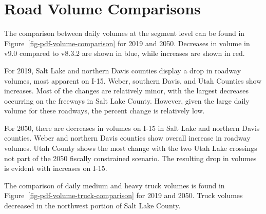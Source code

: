 \documentclass[
  letterpaper,
  DIV=11,
  numbers=noendperiod,
  titlepage=false]{scrreprt}
\begin{document}
\hypertarget{road-volume-comparisons}{%
\section{Road Volume Comparisons}\label{road-volume-comparisons}}

The comparison between daily volumes at the segment level can be found
in Figure~\ref{fig-pdf-volume-comparison} for 2019 and 2050. Decreases
in volume in v9.0 compared to v8.3.2 are shown in blue, while increases
are shown in red.

For 2019, Salt Lake and northern Davis counties display a drop in
roadway volumes, most apparent on I-15. Weber, southern Davis, and Utah
Counties show increases. Most of the changes are relatively minor, with
the largest decreases occurring on the freeways in Salt Lake County.
However, given the large daily volume for these roadways, the percent
change is relatively low.

For 2050, there are decreases in volumes on I-15 in Salt Lake and
northern Davis counties. Weber and northern Davis counties show overall
increase in roadway volumes. Utah County shows the most change with the
two Utah Lake crossings not part of the 2050 fiscally constrained
scenario. The resulting drop in volumes is evident with increases on
I-15.

The comparison of daily medium and heavy truck volumes is found in
Figure~\ref{fig-pdf-volume-truck-comparison} for 2019 and 2050. Truck
volumes decreased in the northwest portion of Salt Lake County.
\end{document}
